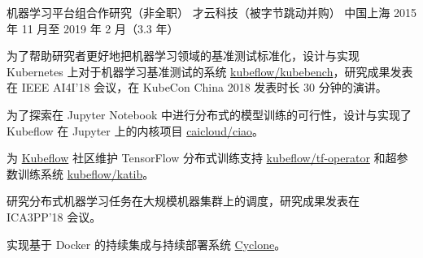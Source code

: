 \begin{cventries}
  \cventry
    {机器学习平台组合作研究（非全职）} %
    {才云科技（被字节跳动并购）} %
    {中国上海} %
    {2015 年 11 月至 2019 年 2 月（3.3 年）} %
    {
      \begin{cvitems} %
        \item 为了帮助研究者更好地把机器学习领域的基准测试标准化，设计与实现 Kubernetes 上对于机器学习基准测试的系统 \href{https://github.com/kubeflow/kubebench}{kubeflow/kubebench}，研究成果发表在 IEEE AI4I'18 会议，在 KubeCon China 2018 发表时长 30 分钟的演讲。
        \item 为了探索在 Jupyter Notebook 中进行分布式的模型训练的可行性，设计与实现了 Kubeflow 在 Jupyter 上的内核项目 \href{https://github.com/caicloud/ciao}{caicloud/ciao}。
        \item 为 \href{https://github.com/kubeflow/kubeflow}{Kubeflow} 社区维护 TensorFlow 分布式训练支持 \href{https://github.com/kubeflow/tf-operator}{kubeflow/tf-operator} 和超参数训练系统 \href{https://github.com/kubeflow/katib}{kubeflow/katib}。
        \item 研究分布式机器学习任务在大规模机器集群上的调度，研究成果发表在 ICA3PP'18 会议。
        \item 实现基于 Docker 的持续集成与持续部署系统 \href{https://github.com/caicloud/cyclone}{Cyclone}。
      \end{cvitems}
    }

\end{cventries}
